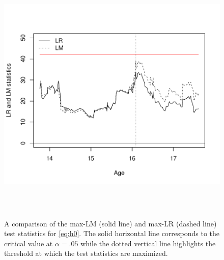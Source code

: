 \documentclass[man]{apa}
\begin{document}
\begin{figure}
\caption{A comparison of the max-LM (solid line) and max-LR (dashed line) test
  statistics for \eqref{eq:h0}.  The solid horizontal line
  corresponds to the critical value at $\alpha=.05$ while the dotted vertical
  line highlights the threshold at which the test statistics are maximized.}
\label{fig:lrlm}
\includegraphics[height=5in]{lmlr_19.pdf}
\end{figure}
\end{document}
